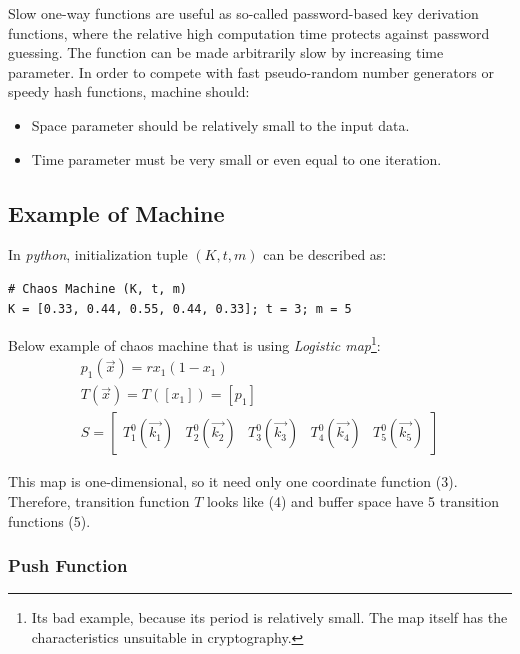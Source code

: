 \documentclass[twocolumn, a4paper, 10pt]{article}
\begin{document}
Slow one-way functions are useful as so-called password-based key derivation functions, where the relative high computation time protects against password guessing. The function can be made arbitrarily slow by increasing time parameter. In order to compete with fast pseudo-random number generators or speedy hash functions, machine should:

\begin{itemize}

\item Space parameter should be relatively small to the input data.

\item Time parameter must be very small or even equal to one iteration.

\end{itemize}

\subsection{Example of Machine}
\label{ssec:example-of-machine}

In \textit{python}, initialization tuple $(K, t, m)$ can be described as:

\begin{lstlisting}[style=codeAppendix, numbers=none]
# Chaos Machine (K, t, m)
K = [0.33, 0.44, 0.55, 0.44, 0.33]; t = 3; m = 5
\end{lstlisting}

\noindent Below example of chaos machine that is using \textit{Logistic map}\footnote{Its bad example, because its period is relatively small. The map itself has the characteristics unsuitable in cryptography.}: \begin{gather} p_1(\vec{x}) = r x_1 (1 - x_1) \\ T(\vec{x}) = T([x_1]) = [p_1] \\ S = \begin{bmatrix} T^0_1(\vec{k_1}) & T^0_2(\vec{k_2}) & T^0_3(\vec{k_3}) & T^0_4(\vec{k_4}) & T^0_5(\vec{k_5}) \end{bmatrix} \end{gather}

This map is one-dimensional, so it need only one coordinate function (3). Therefore, transition function $T$ looks like (4) and buffer space have 5 transition functions (5).

\subsubsection{Push Function}
\end{document}
